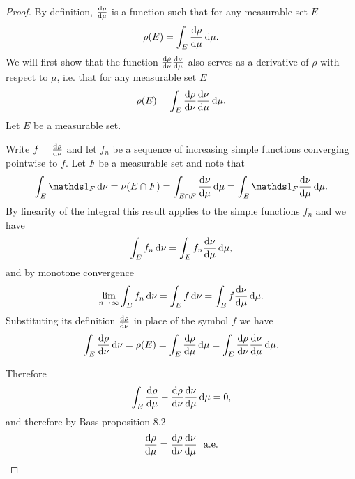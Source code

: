 \begin{proof}
  By definition, $\frac{\d\rho}{\d\mu}$ is a function such that for any measurable set $E$
  \begin{align*}
    \rho(E) = \int_E \frac{\d\rho}{\d\mu} \d\mu.
  \end{align*}
  We will first show that the function $\frac{\d\rho}{\d\nu}\frac{\d\nu}{\d\mu}$ also serves as a derivative
  of $\rho$ with respect to $\mu$, i.e. that for any measurable set $E$
  \begin{align*}
    \rho(E) = \int_E \frac{\d\rho}{\d\nu}\frac{\d\nu}{\d\mu} \d\mu.
  \end{align*}
  Let $E$ be a measurable set.

  Write $f = \frac{\d\rho}{\d\nu}$ and let $f_n$ be a sequence of increasing simple functions converging
  pointwise to $f$. Let $F$ be a measurable set and note that
  \begin{align*}
    \int_E \ind_F \d\nu
    = \nu(E \cap F)
    = \int_{E \cap F} \frac{\d\nu}{\d\mu} \d\mu
    = \int_E \ind_F \frac{\d\nu}{\d\mu} \d\mu.
  \end{align*}
  By linearity of the integral this result applies to the simple functions $f_n$ and we have
  \begin{align*}
    \int_E f_n \d\nu = \int_{E} f_n \frac{\d\nu}{\d\mu}\d\mu,
  \end{align*}
  and by monotone convergence
  \begin{align*}
    \limninf \int_E f_n \d\nu = \int_E f \d\nu = \int_{E} f \frac{\d\nu}{\d\mu}\d\mu.
  \end{align*}
  Substituting its definition $\frac{\d\rho}{\d\nu}$ in place of the symbol $f$ we have
  \begin{align*}
    \int_E \frac{\d\rho}{\d\nu} \d\nu
    = \rho(E)
    = \int_E \frac{\d\rho}{\d\mu} \d\mu
    = \int_{E} \frac{\d\rho}{\d\nu} \frac{\d\nu}{\d\mu}\d\mu.
  \end{align*}

  Therefore
  \begin{align*}
    \int_E \frac{\d\rho}{\d\mu}  - \frac{\d\rho}{\d\nu}\frac{\d\nu}{\d\mu} \d\mu = 0,
  \end{align*}
  and therefore by Bass proposition 8.2
  \begin{align*}
    \frac{\d\rho}{\d\mu} = \frac{\d\rho}{\d\nu}\frac{\d\nu}{\d\mu} \ae
  \end{align*}
\end{proof}

